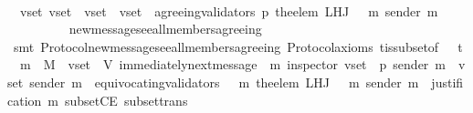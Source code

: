 \begin{isabellebody}
\ \ \ \ \isamarkupfalse%
\ {\isacharminus}\isanewline
\ \ \ \ \ \ \isamarkupfalse%
\ {\isachardoublequoteopen}{\isasymforall}\ v{\isacharunderscore}set{\isacharprime}{\isachardot}\ v{\isacharunderscore}set{\isacharprime}\ {\isasymsubseteq}\ v{\isacharunderscore}set\ {\isasymlongrightarrow}\ v{\isacharunderscore}set{\isacharprime}\ {\isasymsubseteq}\ agreeing{\isacharunderscore}validators\ {\isacharparenleft}p{\isacharcomma}\ the{\isacharunderscore}elem\ {\isacharparenleft}L{\isacharunderscore}H{\isacharunderscore}J\ {\isacharparenleft}{\isasymsigma}\ {\isasymunion}\ {\isacharbraceleft}m{\isacharbraceright}{\isacharparenright}\ {\isacharparenleft}sender\ m{\isacharparenright}{\isacharparenright}{\isacharparenright}{\isachardoublequoteclose}\ \ \isanewline
\ \ \ \ \ \ \ \ \isamarkupfalse%
\ new{\isacharunderscore}message{\isacharunderscore}see{\isacharunderscore}all{\isacharunderscore}members{\isacharunderscore}agreeing\isanewline
\ \ \ \ \ \ \ \ \isamarkupfalse%
\ {\isacharparenleft}smt\ Protocol{\isachardot}new{\isacharunderscore}message{\isacharunderscore}see{\isacharunderscore}all{\isacharunderscore}members{\isacharunderscore}agreeing\ Protocol{\isacharunderscore}axioms\ {\isasymSigma}t{\isacharunderscore}is{\isacharunderscore}subset{\isacharunderscore}of{\isacharunderscore}{\isasymSigma}\ {\isacartoucheopen}{\isasymsigma}\ {\isasymin}\ {\isasymSigma}t\ {\isasymand}\ m\ {\isasymin}\ M\ {\isasymand}\ v{\isacharunderscore}set\ {\isasymsubseteq}\ V{\isacartoucheclose}\ {\isacartoucheopen}immediately{\isacharunderscore}next{\isacharunderscore}message\ {\isacharparenleft}{\isasymsigma}{\isacharcomma}\ m{\isacharparenright}{\isacartoucheclose}\ {\isacartoucheopen}inspector\ {\isacharparenleft}v{\isacharunderscore}set{\isacharcomma}\ {\isasymsigma}{\isacharcomma}\ p{\isacharparenright}{\isacartoucheclose}\ {\isacartoucheopen}sender\ m\ {\isasymin}\ v{\isacharunderscore}set{\isacartoucheclose}\ {\isacartoucheopen}sender\ m\ {\isasymnotin}\ equivocating{\isacharunderscore}validators\ {\isacharparenleft}{\isasymsigma}\ {\isasymunion}\ {\isacharbraceleft}m{\isacharbraceright}{\isacharparenright}{\isacartoucheclose}\ {\isacartoucheopen}the{\isacharunderscore}elem\ {\isacharparenleft}L{\isacharunderscore}H{\isacharunderscore}J\ {\isacharparenleft}{\isasymsigma}\ {\isasymunion}\ {\isacharbraceleft}m{\isacharbraceright}{\isacharparenright}\ {\isacharparenleft}sender\ m{\isacharparenright}{\isacharparenright}\ {\isacharequal}\ justification\ m{\isacartoucheclose}\ subsetCE\ subset{\isacharunderscore}trans{\isacharparenright}\ \isanewline

\end{isabellebody}
